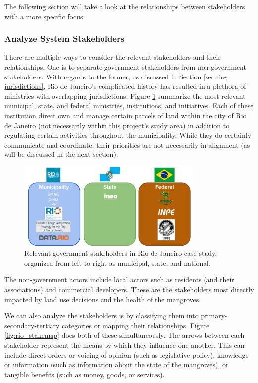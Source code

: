 The following section will take a look at the relationships between stakeholders with a more specific focus.

\subsubsection{Analyze System Stakeholders}

There are multiple ways to consider the relevant stakeholders and their relationships. One is to separate government stakeholders from non-government stakeholders. With regards to the former, as discussed in Section \ref{sec:rio-jurisdictions}, Rio de Janeiro's complicated history has resulted in a plethora of ministries with overlapping jurisdictions. Figure \ref{fig:government-agencies} summarize the most relevant municipal, state, and federal ministries, institutions, and initiatives. Each of these institution direct own and manage certain parcels of land within the city of Rio de Janeiro (not necessarily within this project's study area) in addition to regulating certain activities throughout the municipality. While they do certainly communicate and coordinate, their priorities are not necessarily in alignment (as will be discussed in the next section). 


\begin{figure}[!htb] 
\centering
\includegraphics[width=0.8\textwidth]{Figures/chap4/government-agencies.png}
\caption[Relevant government stakeholders in Rio de Janeiro case study]{Relevant government stakeholders in Rio de Janeiro case study, organized from left to right as municipal, state, and national.}
\label{fig:government-agencies}
\end{figure}

The non-government actors include local actors such as residents (and their associations) and commercial developers. These are the stakeholders most directly impacted by land use decisions and the health of the mangroves.

We can also analyze the stakeholders is by classifying them into primary-secondary-tertiary categories or mapping their relationships. Figure \ref{fig:rio_stakemap} does both of these simultaneously. The arrows between each stakeholder represent the means by which they influence one another. This can include direct orders or voicing of opinion (such as legislative policy), knowledge or information (such as information about the state of the mangroves), or tangible benefits (such as money, goods, or services).

